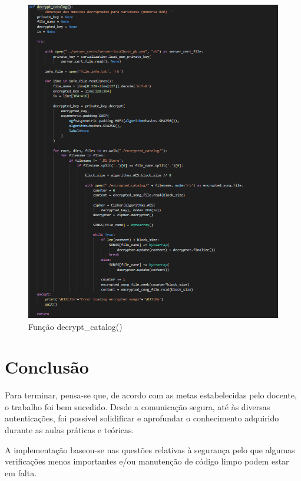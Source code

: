 \documentclass[10pt,english]{article}
\begin{document}
\begin{figure}[!h]
        \centering
        \includegraphics[width=500]{images/Decrypt catalog.png}
        \caption{Função decrypt\_catalog()}
\end{figure}


\clearpage


\section{Conclusão}

\par Para terminar, pensa-se que, de acordo com as metas estabelecidas pelo docente, o trabalho foi bem sucedido. Desde a comunicação segura, até às diversas autenticações, foi possível solidificar e aprofundar o conhecimento adquirido durante as aulas práticas e teóricas.

\par A implementação baseou-se nas questões relativas à segurança pelo que algumas verificações menos importantes e/ou manutenção de código limpo podem estar em falta.
\end{document}
